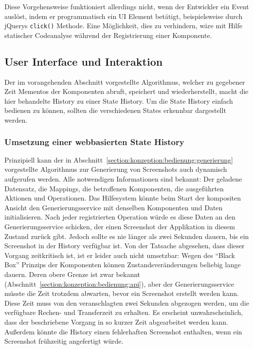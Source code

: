 \documentclass[
	headsepline,
	footsepline,
	fontsize=12pt,
	bibliography=totoc
]{scrbook}
\begin{document}
Diese Vorgehensweise funktioniert allerdings nicht, wenn der Entwickler ein Event auslöst, indem er programmatisch ein UI Element betätigt, beispielsweise durch jQuerys \texttt{click()} Methode. Eine Möglichkeit, dies zu verhindern, wäre mit Hilfe statischer Codeanalyse während der Registrierung einer Komponente.

\subsection{User Interface und Interaktion}
\label{section:konzeption:history:ui}


Der im vorangehenden Abschnitt vorgestellte Algorithmus, welcher zu gegebener Zeit Mementos der Komponenten abruft, speichert und wiederherstellt, macht die hier behandelte History zu einer State History. Um die State History einfach bedienen zu können, sollten die verschiedenen States erkennbar dargestellt werden.

\subsubsection{Umsetzung einer webbasierten State History}


Prinzipiell kann der in Abschnitt~\ref{section:konzeption:bedienung:generierung} vorgestellte Algorithmus zur Generierung von Screenshots auch dynamisch aufgerufen werden. Alle notwendigen Informationen sind bekannt: Der geladene Datensatz, die Mappings, die betroffenen Komponenten, die ausgeführten Aktionen und Operationen. Das Hilfesystem könnte beim Start der kompositen Ansicht den Generierungsservice mit denselben Komponenten und Daten initialisieren. Nach jeder registrierten Operation würde es diese Daten an den Generierungsservice schicken, der einen Screenshot der Applikation in diesem Zustand zurück gibt. Jedoch sollte es nie länger als zwei Sekunden dauern, bis ein Screenshot in der History verfügbar ist. Von der Tatsache abgesehen, dass dieser Vorgang zeitkritisch ist, ist er leider auch nicht umsetzbar: Wegen des \enquote{Black Box} Prinzips der Komponenten können Zustandsveränderungen beliebig lange dauern. Deren obere Grenze ist zwar bekannt (Abschnitt~\ref{section:konzeption:bedienung:api}), aber der Generierungsservice müsste die Zeit trotzdem abwarten, bevor ein Screenshot erstellt werden kann. Diese Zeit muss von den veranschlagten zwei Sekunden abgezogen werden, um die verfügbare Rechen- und Transferzeit zu erhalten. Es erscheint unwahrscheinlich, dass der beschriebene Vorgang in so kurzer Zeit abgearbeitet werden kann. Außerdem könnte die History einen fehlerhaften Screenshot enthalten, wenn ein Screenshot frühzeitig angefertigt würde.
\end{document}

